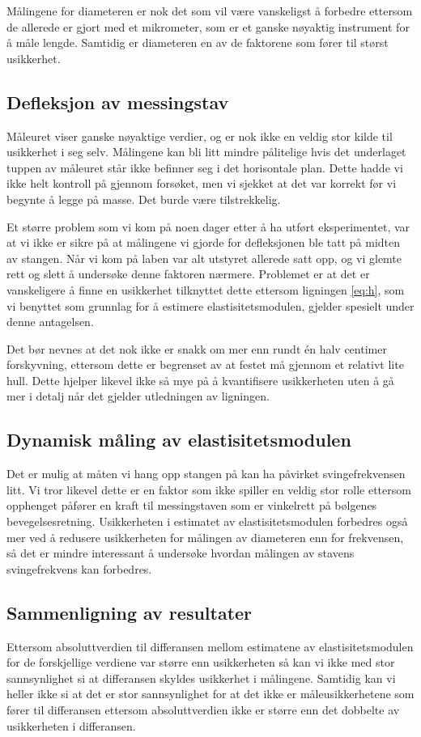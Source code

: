 \documentclass[a4paper,11pt, twocolumn]{article}
\begin{document}
Målingene for diameteren er nok det som vil være vanskeligst å forbedre ettersom de allerede er gjort med et mikrometer, som er et ganske nøyaktig instrument for å måle lengde. Samtidig er diameteren en av de faktorene som fører til størst usikkerhet.

\subsection{Defleksjon av messingstav}
Måleuret viser ganske nøyaktige verdier, og er nok ikke en veldig stor kilde til usikkerhet i seg selv. Målingene kan bli litt mindre pålitelige hvis det underlaget tuppen av måleuret står ikke befinner seg i det horisontale plan. Dette hadde vi ikke helt kontroll på gjennom forsøket, men vi sjekket at det var korrekt før vi begynte å legge på masse. Det burde være tilstrekkelig.

Et større problem som vi kom på noen dager etter å ha utført eksperimentet, var at vi ikke er sikre på at målingene vi gjorde for defleksjonen ble tatt på midten av stangen. Når vi kom på laben var alt utstyret allerede satt opp, og vi glemte rett og slett å undersøke denne faktoren nærmere. Problemet er at det er vanskeligere å finne en usikkerhet tilknyttet dette ettersom ligningen \eqref{eq:h}, som vi benyttet som grunnlag for å estimere elastisitetsmodulen, gjelder spesielt under denne antagelsen. 

Det bør nevnes at det nok ikke er snakk om mer enn rundt \'en halv centimer forskyvning, ettersom dette er begrenset av at festet må gjennom et relativt lite hull. Dette hjelper likevel ikke så mye på å kvantifisere usikkerheten uten å gå mer i detalj når det gjelder utledningen av ligningen.

\subsection{Dynamisk måling av elastisitetsmodulen}
Det er mulig at måten vi hang opp stangen på kan ha påvirket svingefrekvensen litt. Vi tror likevel dette er en faktor som ikke spiller en veldig stor rolle ettersom opphenget påfører en kraft til messingstaven som er vinkelrett på bølgenes bevegelsesretning. Usikkerheten i estimatet av elastisitetsmodulen forbedres også mer ved å redusere usikkerheten for målingen av diameteren enn for frekvensen, så det er mindre interessant å undersøke hvordan målingen av stavens svingefrekvens kan forbedres.

\subsection{Sammenligning av resultater}
Ettersom absoluttverdien til differansen mellom estimatene av elastisitetsmodulen for de forskjellige verdiene var større enn usikkerheten så kan vi ikke med stor sannsynlighet si at differansen skyldes usikkerhet i målingene. Samtidig kan vi heller ikke si at det er stor sannsynlighet for at det ikke er måleusikkerhetene som fører til differansen ettersom absoluttverdien ikke er større enn det dobbelte av usikkerheten i differansen.
\end{document}
